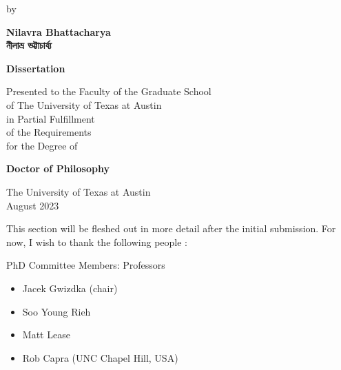 \documentclass[letterpaper, nobind]{templates/ociamthesis}
\providecommand{\tightlist}{%
  \setlength{\itemsep}{0pt}\setlength{\parskip}{0pt}}
\begin{document}
\begin{romanpages}
\begin{center}
  \vspace*{24pt}

  \begin{spacing}{1.4}
    by\\
    
    \vspace*{24pt}
    
    {\Large{\textbf{
      Nilavra Bhattacharya\\
      \vspace*{10pt}
      {\Huge {\secondlanguage নীলাভ্র ভট্টাচার্য্য}}
    }}}
    
    \vspace*{72pt}
    
    {\Large{\textbf{Dissertation}}}\\
    
    \vspace*{24pt}
    
    Presented to the Faculty of the Graduate School\\
    of The University of Texas at Austin\\
    in Partial Fulfillment\\
    of the Requirements\\
    for the Degree of\\
    
    \vspace*{30pt}
    
    {\Large{\textbf{Doctor of Philosophy}}}\\
    
    \vfill

    {\large{The University of Texas at Austin\\
    August 2023}}

  \end{spacing}
\end{center}







\begin{acknowledgements}
 	This section will be fleshed out in more detail after the initial submission. For now, I wish to thank the following people :

 PhD Committee Members: Professors

 \begin{itemize}
 \tightlist
 \item
   Jacek Gwizdka (chair)
 \item
   Soo Young Rieh
 \item
   Matt Lease
 \item
   Rob Capra (UNC Chapel Hill, USA)
 \end{itemize}


\end{acknowledgements}
\end{romanpages}
\end{document}
